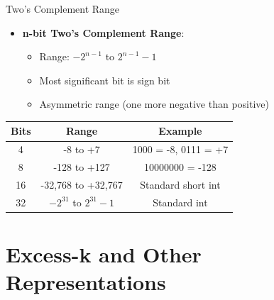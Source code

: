\documentclass[aspectratio=169,11pt]{beamer}
\newcommand{\concept}[1]{\textbf{\color{accentcolor}#1}}
\begin{document}
\begin{frame}{Two's Complement Range}
\begin{itemize}
\item \concept{n-bit Two's Complement Range}:
\begin{itemize}
\item Range: $-2^{n-1}$ to $2^{n-1}-1$
\item Most significant bit is sign bit
\item Asymmetric range (one more negative than positive)
\end{itemize}
\end{itemize}

\vspace{0.5cm}
\begin{center}
\begin{tabular}{|c|c|c|}
\hline
\textbf{Bits} & \textbf{Range} & \textbf{Example} \\
\hline
4 & -8 to +7 & 1000 = -8, 0111 = +7 \\
8 & -128 to +127 & 10000000 = -128 \\
16 & -32,768 to +32,767 & Standard short int \\
32 & $-2^{31}$ to $2^{31}-1$ & Standard int \\
\hline
\end{tabular}
\end{center}
\end{frame}

\section{Excess-k and Other Representations}
\end{document}
